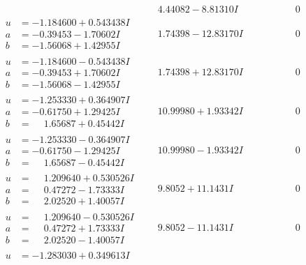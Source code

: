 \documentclass[1p]{elsarticle_modified}
\theoremstyle{definition}
\begin{document}
$$\begin{array}{c|c|c}
 & \phantom{-}4.44082 - 8.81310 I & \phantom{-0.000000 } 0 \\ \hline\begin{aligned}
u &= -1.184600 + 0.543438 I \\
a &= -0.39453 - 1.70602 I \\
b &= -1.56068 + 1.42955 I\end{aligned}
 & \phantom{-}1.74398 - 12.83170 I & \phantom{-0.000000 } 0 \\ \hline\begin{aligned}
u &= -1.184600 - 0.543438 I \\
a &= -0.39453 + 1.70602 I \\
b &= -1.56068 - 1.42955 I\end{aligned}
 & \phantom{-}1.74398 + 12.83170 I & \phantom{-0.000000 } 0 \\ \hline\begin{aligned}
u &= -1.253330 + 0.364907 I \\
a &= -0.61750 + 1.29425 I \\
b &= \phantom{-}1.65687 + 0.45442 I\end{aligned}
 & \phantom{-}10.99980 + 1.93342 I & \phantom{-0.000000 } 0 \\ \hline\begin{aligned}
u &= -1.253330 - 0.364907 I \\
a &= -0.61750 - 1.29425 I \\
b &= \phantom{-}1.65687 - 0.45442 I\end{aligned}
 & \phantom{-}10.99980 - 1.93342 I & \phantom{-0.000000 } 0 \\ \hline\begin{aligned}
u &= \phantom{-}1.209640 + 0.530526 I \\
a &= \phantom{-}0.47272 - 1.73333 I \\
b &= \phantom{-}2.02520 + 1.40057 I\end{aligned}
 & \phantom{-}9.8052 + 11.1431 I & \phantom{-0.000000 } 0 \\ \hline\begin{aligned}
u &= \phantom{-}1.209640 - 0.530526 I \\
a &= \phantom{-}0.47272 + 1.73333 I \\
b &= \phantom{-}2.02520 - 1.40057 I\end{aligned}
 & \phantom{-}9.8052 - 11.1431 I & \phantom{-0.000000 } 0 \\ \hline\begin{aligned}
u &= -1.283030 + 0.349613 I \\

\end{aligned}
\end{array}$$
\end{document}
